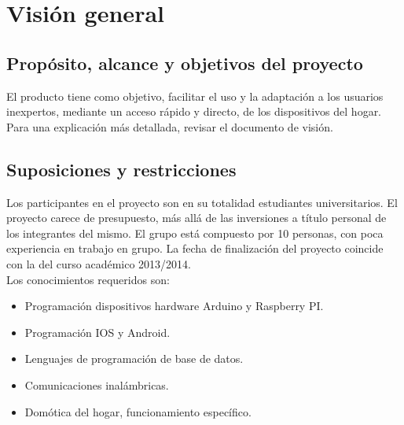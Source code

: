 \chapter{Visión general}
\section{Propósito, alcance y objetivos del proyecto}
El producto tiene como objetivo, facilitar el uso y la adaptación a los usuarios inexpertos, mediante un acceso rápido y directo, de los dispositivos del hogar. Para una explicación más detallada, revisar el documento de visión.
\section{Suposiciones y restricciones}
Los participantes en el proyecto son en su totalidad estudiantes universitarios. El proyecto carece de presupuesto, más allá de las inversiones a título personal de los integrantes del mismo. El grupo está compuesto por 10 personas, con poca experiencia en trabajo en grupo.
La fecha de finalización del proyecto coincide con la del curso académico 2013/2014.\\

Los conocimientos requeridos son:
\begin{itemize}

\item	Programación dispositivos hardware Arduino y Raspberry PI.
\item	Programación IOS y Android.
\item	Lenguajes de programación de base de datos.
\item	Comunicaciones inalámbricas.
\item	Domótica del hogar, funcionamiento específico.

\end{itemize}
